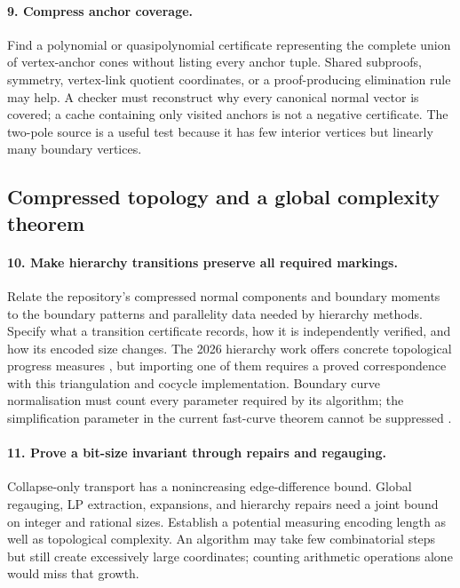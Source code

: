 \paragraph{9. Compress anchor coverage.}
Find a polynomial or quasipolynomial certificate representing the complete
union of vertex-anchor cones without listing every anchor tuple. Shared
subproofs, symmetry, vertex-link quotient coordinates, or a proof-producing
elimination rule may help. A checker must reconstruct why every canonical
normal vector is covered; a cache containing only visited anchors is not a
negative certificate. The two-pole source is a useful test because it has
few interior vertices but linearly many boundary vertices.

\subsection{Compressed topology and a global complexity theorem}

\paragraph{10. Make hierarchy transitions preserve all required markings.}
Relate the repository's compressed normal components and boundary moments
to the boundary patterns and parallelity data needed by hierarchy methods.
Specify what a transition certificate records, how it is independently
verified, and how its encoded size changes. The 2026 hierarchy work offers
concrete topological progress measures \cite{Lackenby2026}, but importing
one of them requires a proved correspondence with this triangulation and
cocycle implementation. Boundary curve normalisation must count every
parameter required by its algorithm; the simplification parameter in the
current fast-curve theorem cannot be suppressed \cite{LackenbyCurves}.

\paragraph{11. Prove a bit-size invariant through repairs and regauging.}
Collapse-only transport has a nonincreasing edge-difference bound. Global
regauging, LP extraction, expansions, and hierarchy repairs need a joint
bound on integer and rational sizes. Establish a potential measuring
encoding length as well as topological complexity. An algorithm may take
few combinatorial steps but still create excessively large coordinates;
counting arithmetic operations alone would miss that growth.

